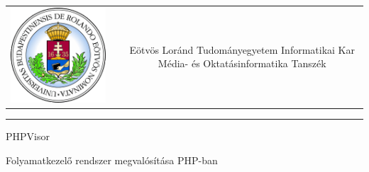 \documentclass[12pt]{report}
\begin{document}
  \begin{titlepage}
      \vspace*{0cm}
      \centering
      \begin{tabular}{cp{1cm}c}
          \begin{minipage}{4cm}
              \vspace{0pt}
              \includegraphics[width=1\textwidth]{pics/elte_cimer}
          \end{minipage} & &
          \begin{minipage}{7cm}
              \vspace{0pt}Eötvös Loránd Tudományegyetem \vspace{10pt} \newline
              Informatikai Kar \vspace{10pt} \newline
              Média- és Oktatásinformatika Tanszék
          \end{minipage}
      \end{tabular}

      \vspace*{0.2cm}
      \rule{\textwidth}{1pt}

      \vspace*{6cm}
      {\Huge PHPVisor }

      \vspace*{0.5cm}
      {\normalsize Folyamatkezelő rendszer megvalósítása PHP-ban}



\end{titlepage}
\end{document}
